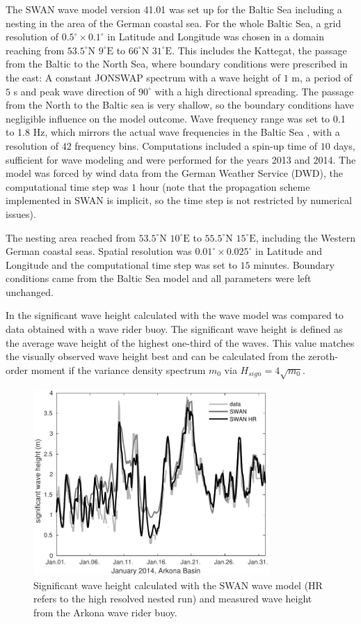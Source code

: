 The SWAN wave model version 41.01 was set up for the Baltic Sea including a 
nesting in the area of the German coastal sea. For the whole Baltic Sea, a grid 
resolution of $0.5^\circ \times 0.1^\circ $ in Latitude and Longitude was chosen 
in a domain reaching from $53.5^\circ \text{N } 9^\circ \text{E}$ to $66^\circ 
\text{N } 31^\circ \text{E}$. This includes the Kattegat, the passage from the 
Baltic to the North Sea, where boundary conditions were prescribed in the east: 
A constant JONSWAP spectrum with a wave height of $1$ m, a period of $5$ s and 
peak wave direction of $90^\circ$ with a high directional spreading. The passage 
from the North to the Baltic sea is very shallow, so the boundary conditions 
have negligible influence on the model outcome. Wave frequency range was set to 
0.1 to 1.8 Hz, which mirrors the actual wave frequencies in the Baltic 
Sea \citep[][]{balticsea}, with a resolution of $42$ frequency bins. 
Computations included a spin-up time of $10$ days, sufficient for wave modeling 
and were performed for the years 2013 and 2014. The model was forced by wind 
data from the German Weather Service (DWD), the computational time step was $1$ 
hour (note that the propagation scheme implemented in SWAN is implicit, so the 
time step is not restricted by numerical issues). 

The nesting area reached from $53.5^\circ \text{N } 10^\circ \text{E}$ to 
$55.5^\circ \text{N } 15^\circ \text{E}$, including the Western German coastal 
seas. Spatial resolution was $0.01^\circ \times 0.025^\circ $ in Latitude and 
Longitude and the computational time step was set to $15$ minutes. Boundary 
conditions came from the Baltic Sea model and all parameters were left 
unchanged.

In  the significant wave height calculated with the wave model was 
compared to data obtained with a wave rider buoy. The significant wave height 
is defined as the average wave height of the highest one-third of the waves. 
This value matches the visually observed wave height best and can be calculated 
from the zeroth-order moment if the variance density spectrum $m_0$ via 
$H_{sign} = 4 \sqrt{m_0}$.
\begin{figure}[ht]
 \includegraphics[width=9cm]{bilder/januar.pdf}
 \caption{Significant wave height calculated with the SWAN wave model (HR 
refers to the high resolved nested run) and measured wave height from the 
Arkona wave rider buoy.\label{verify}}
\end{figure}

